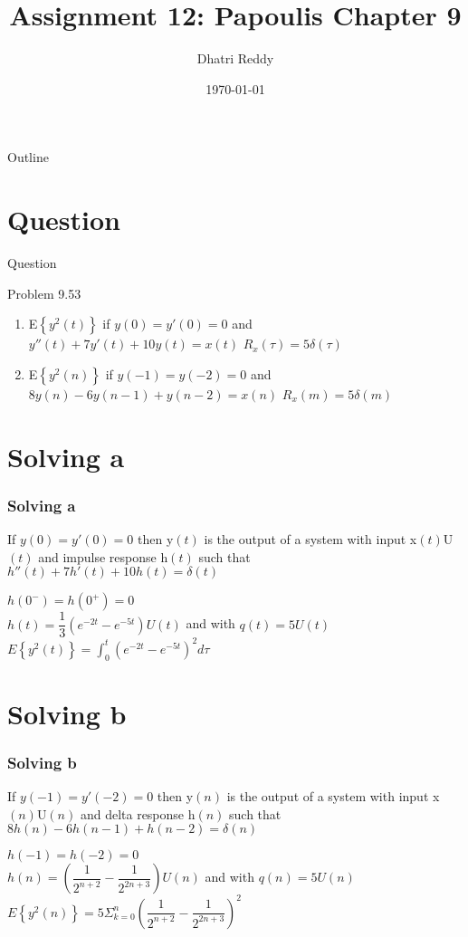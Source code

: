 \documentclass{beamer}
\title{Assignment 12: Papoulis Chapter 9 }
\author{Dhatri Reddy}
\date{\today}
\providecommand{\cbrak}[1]{\ensuremath{\left\{#1\right\}}}
\providecommand{\brak}[1]{\ensuremath{\left(#1\right)}}
\begin{document}
\begin{frame}
    \titlepage 
\end{frame}

\logo{}

\begin{frame}{Outline}
    \tableofcontents
\end{frame}

\section{Question}
\begin{frame}{Question}
    \begin{block}{Problem 9.53}
    \begin{enumerate}[label=(\alph*)]
    \item  E\cbrak{y^{2}\brak{t}} if $y\brak{0} = y'\brak{0} = 0$ and $y''\brak{t} + 7y'\brak{t} + 10y\brak{t} = x\brak{t}$   $R_{x}\brak{\tau} = 5\delta\brak{\tau}$
    \item E\cbrak{y^{2}\brak{n}} if $y\brak{-1} = y\brak{-2} = 0$ and $8y\brak{n} - 6y\brak{n-1} + y\brak{n-2} = x\brak{n}$    $R_{x}\brak{m} = 5\delta\brak{m}$
    \end{enumerate}
\end{block}
\end{frame}

\section{Solving a}
\begin{frame}
\frametitle{Solving a}
If $y\brak{0} = y'\brak{0} = 0$ then y\brak{t} is the output of a system with input x\brak{t}U\brak{t} and impulse response h\brak{t} such that $h''\brak{t} + 7h'\brak{t} + 10h\brak{t} = \delta\brak{t}$

$h\brak{0^{-}} = h\brak{0^{+}} = 0$\\
$h\brak{t} = \dfrac{1}{3}\brak{e^{-2t} - e^{-5t}}U\brak{t}$ and with $q\brak{t} = 5U\brak{t}$ 
$E\cbrak{y^{2}\brak{t}} = \int_{0}^t\brak{e^{-2t} - e^{-5t}}^{2}d\tau$

\end{frame}

\section{Solving b}
\begin{frame}
\frametitle{Solving b}
If $y\brak{-1} = y'\brak{-2} = 0$ then y\brak{n} is the output of a system with input x\brak{n}U\brak{n} and delta response h\brak{n} such that $8h\brak{n} - 6h\brak{n-1} + h\brak{n-2} = \delta\brak{n}$

$h\brak{-1} = h\brak{-2} = 0$\\
$h\brak{n} = \brak{\dfrac{1}{2^{n+2}} - \dfrac{1}{2^{2n+3}}}U\brak{n}$ and with $q\brak{n} = 5U\brak{n}$ 
$E\cbrak{y^{2}\brak{n}} = 5\Sigma^{n}_{k=0}\brak{\dfrac{1}{2^{n+2}} - \dfrac{1}{2^{2n+3}}}^{2}$

\end{frame}
\end{document}

